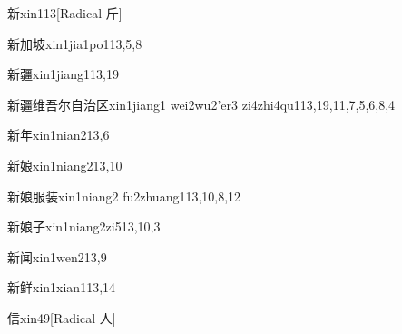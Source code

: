 \begin{entry}{新}{xin1}{13}[Radical 斤]
\end{entry}

\begin{entry}{新加坡}{xin1jia1po1}{13,5,8}
\end{entry}

\begin{entry}{新疆}{xin1jiang1}{13,19}
\end{entry}

\begin{entry}{新疆维吾尔自治区}{xin1jiang1 wei2wu2'er3 zi4zhi4qu1}{13,19,11,7,5,6,8,4}
\end{entry}

\begin{entry}{新年}{xin1nian2}{13,6}
\end{entry}

\begin{entry}{新娘}{xin1niang2}{13,10}
\end{entry}

\begin{entry}{新娘服装}{xin1niang2 fu2zhuang1}{13,10,8,12}
\end{entry}

\begin{entry}{新娘子}{xin1niang2zi5}{13,10,3}
\end{entry}

\begin{entry}{新闻}{xin1wen2}{13,9}
\end{entry}

\begin{entry}{新鲜}{xin1xian1}{13,14}
\end{entry}

\begin{entry}{信}{xin4}{9}[Radical 人]
\end{entry}

